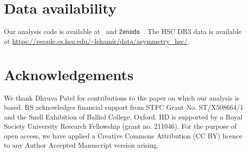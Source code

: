 \documentclass{aastex631}
\newcommand{\github}[1]{\href{#1}{\faGithubSquare}}
\newcommand{\githublink}{\github{https://github.com/harrydesmond/GalaxySpinAnisotropy}}
\begin{document}
\section*{Data availability}

Our analysis code is available at \githublink~and \texttt{Zenodo}~\citep{harry_desmond_2024_14036930}. The HSC DR3 data is available at \url{https://people.cs.ksu.edu/~lshamir/data/asymmetry_hsc/}.

\section*{Acknowledgements}

We thank Dhruva Patel for contributions to the paper on which our analysis is based. RS acknowledges financial support from STFC Grant No. ST/X508664/1 and the Snell Exhibition of Balliol College, Oxford. HD is supported by a Royal Society University Research Fellowship (grant no. 211046). For the purpose of open access, we have applied a Creative Commons Attribution (CC BY) licence to any Author Accepted Manuscript version arising.

{}

\end{document}
